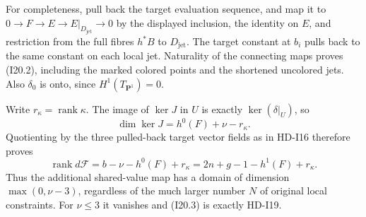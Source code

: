 For completeness, pull back the target evaluation sequence, and
map it to
$0\to F\to E\to E|_{D_{\mathrm{jet}}}\to0$ by the displayed
inclusion, the identity on $E$, and restriction from the full
fibres $h^*B$ to $D_{\mathrm{jet}}$. The target constant at
$b_i$ pulls back to the same constant on each local jet.
Naturality of the connecting maps proves (I20.2), including
the marked colored points and the shortened uncolored jets.
Also $\delta_0$ is onto, since $H^1(T_{\mathbf P^1})=0$.

Write $r_\kappa=\operatorname{rank}\kappa$. The image of
$\ker J$ in $U$ is exactly $\ker(\delta|_U)$, so
\[
 \dim\ker J=h^0(F)+\nu-r_\kappa.
\]
Quotienting by the three pulled-back target vector fields as
in HD-I16 therefore proves
\begin{equation}
 \boxed{\operatorname{rank}d\mathcal F
       =b-\nu-h^0(F)+r_\kappa
       =2n+g-1-h^1(F)+r_\kappa.}                     \tag{I20.3}
\end{equation}
Thus the additional shared-value map has a domain of dimension
$\max(0,\nu-3)$, regardless of the much larger number $N$ of
original local constraints. For $\nu\leq3$ it vanishes and
(I20.3) is exactly HD-I19.

